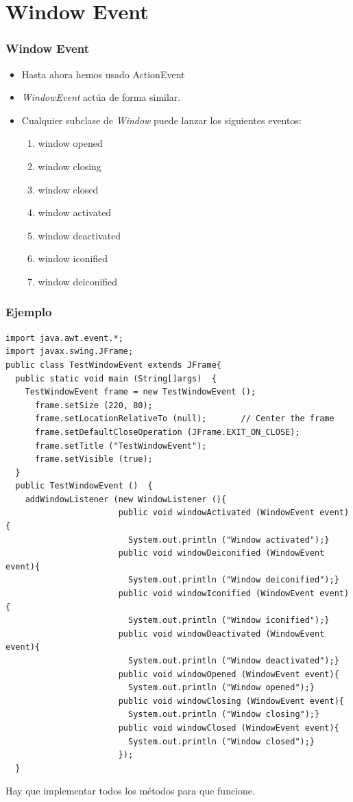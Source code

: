 \documentclass{beamer}
\begin{document}
\section{Window Event}
\begin{frame}[fragile]
\frametitle{Window Event}
\begin{itemize}[<+->]
\item Hasta ahora hemos usado ActionEvent
\item \emph{WindowEvent} actúa de forma similar.
\item Cualquier subclase de \emph{Window} puede lanzar los siguientes eventos:
\begin{enumerate}
\item window opened
\item window closing
\item window closed
\item window activated
\item window deactivated
\item window iconified
\item window deiconified
\end{enumerate}
\end{itemize}
\end{frame}



\begin{frame}[fragile]
    \frametitle{Ejemplo}
       \begin{tiny}
       \begin{verbatim}
import java.awt.event.*;
import javax.swing.JFrame;
public class TestWindowEvent extends JFrame{
  public static void main (String[]args)  {
    TestWindowEvent frame = new TestWindowEvent ();
      frame.setSize (220, 80);
      frame.setLocationRelativeTo (null);       // Center the frame
      frame.setDefaultCloseOperation (JFrame.EXIT_ON_CLOSE);
      frame.setTitle ("TestWindowEvent");
      frame.setVisible (true);
  }
  public TestWindowEvent ()  {
    addWindowListener (new WindowListener (){
                       public void windowActivated (WindowEvent event){
                         System.out.println ("Window activated");}
                       public void windowDeiconified (WindowEvent event){
                         System.out.println ("Window deiconified");}
                       public void windowIconified (WindowEvent event){
                         System.out.println ("Window iconified");}
                       public void windowDeactivated (WindowEvent event){
                         System.out.println ("Window deactivated");}
                       public void windowOpened (WindowEvent event){
                         System.out.println ("Window opened");}
                       public void windowClosing (WindowEvent event){
                         System.out.println ("Window closing");}
                       public void windowClosed (WindowEvent event){
                         System.out.println ("Window closed");}
                       });
  }
       \end{verbatim}
       \end{tiny}
       Hay que implementar todos los métodos para que funcione.
\end{frame}
\end{document}
